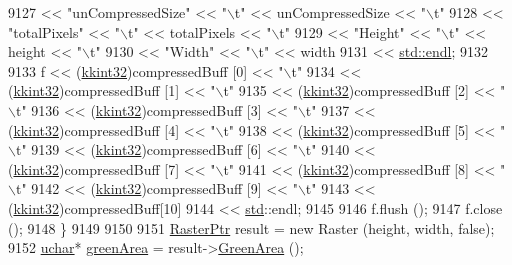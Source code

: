\begin{DoxyCode}
9127       << \textcolor{stringliteral}{"unCompressedSize"} << \textcolor{stringliteral}{"\(\backslash\)t"}  << unCompressedSize      << \textcolor{stringliteral}{"\(\backslash\)t"}
9128       << \textcolor{stringliteral}{"totalPixels"}      << \textcolor{stringliteral}{"\(\backslash\)t"}  << totalPixels           << \textcolor{stringliteral}{"\(\backslash\)t"}
9129       << \textcolor{stringliteral}{"Height"}           << \textcolor{stringliteral}{"\(\backslash\)t"}  << height                << \textcolor{stringliteral}{"\(\backslash\)t"} 
9130       << \textcolor{stringliteral}{"Width"}            << \textcolor{stringliteral}{"\(\backslash\)t"}  << width
9131       << \hyperlink{namespace_k_k_b_ad1f50f65af6adc8fa9e6f62d007818a8}{std::endl};
9132 
9133     f <<  (\hyperlink{namespace_k_k_b_a8fa4952cc84fda1de4bec1fbdd8d5b1b}{kkint32})compressedBuff [0] << \textcolor{stringliteral}{"\(\backslash\)t"}
9134       <<  (\hyperlink{namespace_k_k_b_a8fa4952cc84fda1de4bec1fbdd8d5b1b}{kkint32})compressedBuff [1] << "\(\backslash\)t"
9135       <<  (\hyperlink{namespace_k_k_b_a8fa4952cc84fda1de4bec1fbdd8d5b1b}{kkint32})compressedBuff [2] << "\(\backslash\)t"
9136       <<  (\hyperlink{namespace_k_k_b_a8fa4952cc84fda1de4bec1fbdd8d5b1b}{kkint32})compressedBuff [3] << "\(\backslash\)t"
9137       <<  (\hyperlink{namespace_k_k_b_a8fa4952cc84fda1de4bec1fbdd8d5b1b}{kkint32})compressedBuff [4] << "\(\backslash\)t"
9138       <<  (\hyperlink{namespace_k_k_b_a8fa4952cc84fda1de4bec1fbdd8d5b1b}{kkint32})compressedBuff [5] << "\(\backslash\)t"
9139       <<  (\hyperlink{namespace_k_k_b_a8fa4952cc84fda1de4bec1fbdd8d5b1b}{kkint32})compressedBuff [6] << "\(\backslash\)t"
9140       <<  (\hyperlink{namespace_k_k_b_a8fa4952cc84fda1de4bec1fbdd8d5b1b}{kkint32})compressedBuff [7] << "\(\backslash\)t"
9141       <<  (\hyperlink{namespace_k_k_b_a8fa4952cc84fda1de4bec1fbdd8d5b1b}{kkint32})compressedBuff [8] << "\(\backslash\)t"
9142       <<  (\hyperlink{namespace_k_k_b_a8fa4952cc84fda1de4bec1fbdd8d5b1b}{kkint32})compressedBuff [9] << "\(\backslash\)t"
9143       <<  (\hyperlink{namespace_k_k_b_a8fa4952cc84fda1de4bec1fbdd8d5b1b}{kkint32})compressedBuff[10] 
9144       << \hyperlink{namespacestd}{std}::endl;
9145 
9146     f.flush ();
9147     f.close ();
9148   \}
9149 
9150 
9151   \hyperlink{class_k_k_b_1_1_raster}{RasterPtr}  result = new Raster (height, width, false);
9152   \hyperlink{namespace_k_k_b_ace9969169bf514f9ee6185186949cdf7}{uchar}* \hyperlink{class_k_k_b_1_1_raster_ad981258f1f7284a8bd0cd0466f328cdf}{greenArea} = result->\hyperlink{class_k_k_b_1_1_raster_af6ceacfa7835a295d239d141627dbec7}{GreenArea} ();

\end{DoxyCode}

